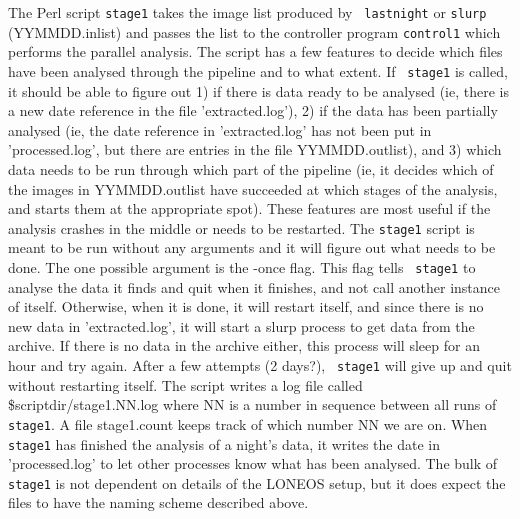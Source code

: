 \documentclass{article}
\begin{document}
The Perl script {\tt stage1} takes the image list produced by {\tt
lastnight} or {\tt slurp} (YYMMDD.inlist) and passes the list to the
controller program {\tt control1} which performs the parallel
analysis.  The script has a few features to decide which files have
been analysed through the pipeline and to what extent.  If {\tt
stage1} is called, it should be able to figure out 1) if there is data
ready to be analysed (ie, there is a new date reference in the file
'extracted.log'), 2) if the data has been partially analysed (ie, the
date reference in 'extracted.log' has not been put in 'processed.log',
but there are entries in the file YYMMDD.outlist), and 3) which data
needs to be run through which part of the pipeline (ie, it decides
which of the images in YYMMDD.outlist have succeeded at which stages
of the analysis, and starts them at the appropriate spot).  These
features are most useful if the analysis crashes in the middle or
needs to be restarted.  The {\tt stage1} script is meant to be run
without any arguments and it will figure out what needs to be done.
The one possible argument is the -once flag.  This flag tells {\tt
stage1} to analyse the data it finds and quit when it finishes, and
not call another instance of itself.  Otherwise, when it is done, it
will restart itself, and since there is no new data in
'extracted.log', it will start a slurp process to get data from the
archive.  If there is no data in the archive either, this process will
sleep for an hour and try again.  After a few attempts (2 days?), {\tt
stage1} will give up and quit without restarting itself.  The script
writes a log file called \$scriptdir/stage1.NN.log where NN is a
number in sequence between all runs of {\tt stage1}.  A file
stage1.count keeps track of which number NN we are on.  When {\tt
stage1} has finished the analysis of a night's data, it writes the
date in 'processed.log' to let other processes know what has been
analysed.  The bulk of {\tt stage1} is not dependent on details of the
LONEOS setup, but it does expect the files to have the naming scheme
described above.
\end{document}
